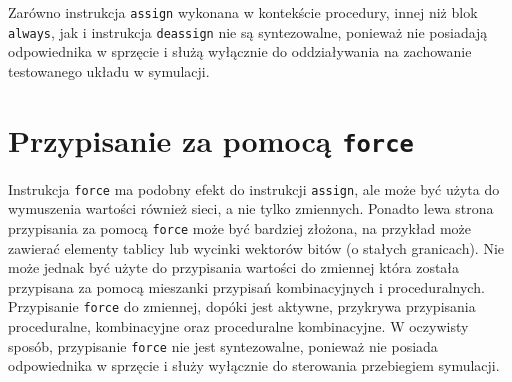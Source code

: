 \documentclass[shortabstract, inz]{iithesis}
\begin{document}
Zarówno instrukcja \texttt{assign} wykonana w kontekście procedury, innej niż blok \texttt{always}, jak i instrukcja \texttt{deassign} nie są syntezowalne, ponieważ nie posiadają odpowiednika w sprzęcie i służą wyłącznie do oddziaływania na zachowanie testowanego układu w symulacji.

\section{Przypisanie za pomocą \texttt{force}}
Instrukcja \texttt{force} ma podobny efekt do instrukcji \texttt{assign}, ale może być użyta do wymuszenia wartości również sieci, a nie tylko zmiennych. Ponadto lewa strona przypisania za pomocą \texttt{force} może być bardziej złożona, na przykład może zawierać elementy tablicy lub wycinki wektorów bitów (o stałych granicach). Nie może jednak być użyte do przypisania wartości do zmiennej która została przypisana za pomocą mieszanki przypisań kombinacyjnych i proceduralnych.
Przypisanie \texttt{force} do zmiennej, dopóki jest aktywne, przykrywa przypisania proceduralne, kombinacyjne oraz proceduralne kombinacyjne.
W oczywisty sposób, przypisanie \texttt{force} nie jest syntezowalne, ponieważ nie posiada odpowiednika w sprzęcie i służy wyłącznie do sterowania przebiegiem symulacji.
\end{document}
